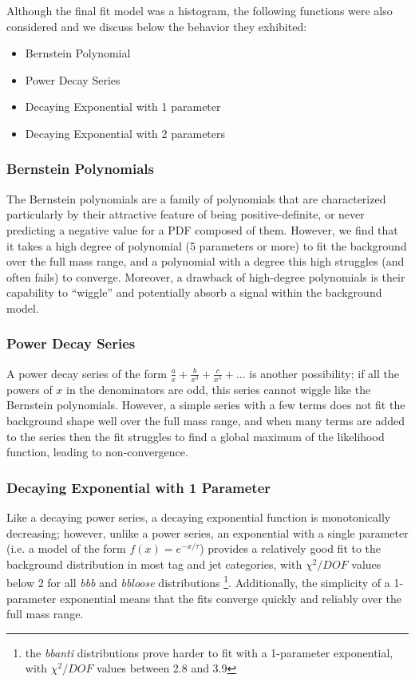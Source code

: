 Although the final fit model was a histogram, the following functions were
also considered and we discuss below the behavior they exhibited:
\begin{itemize}
    \item Bernstein Polynomial
    \item Power Decay Series
    \item Decaying Exponential with 1 parameter
    \item Decaying Exponential with 2 parameters
\end{itemize}

\subsubsection{Bernstein Polynomials}
The Bernstein polynomials are a family of polynomials that are characterized
particularly by their attractive feature of being positive-definite, or never
predicting a negative value for a PDF composed of them.  However, we find
that it takes a high degree of polynomial (5 parameters or more) to fit the
background over the full mass range, and a polynomial with a 
degree this high struggles (and often fails) to converge.  Moreover, a
drawback of high-degree polynomials is their capability to ``wiggle'' and
potentially absorb a signal within the background model.

\subsubsection{Power Decay Series}
A power decay series of the form $\frac{a}{x} + \frac{b}{x^3} + \frac{c}{x^5} + ...$
is another possibility; if all the powers of $x$ in the denominators are
odd, this series cannot wiggle like the Bernstein polynomials.  However,
a simple series with a few terms does not fit the background shape well 
over the full mass range, and when many terms are added to the series then
the fit struggles to find a global maximum of the likelihood function, leading
to non-convergence.

\subsubsection{Decaying Exponential with 1 Parameter}
Like a decaying power series, a decaying exponential function is monotonically
decreasing; however, unlike a power series, an exponential with a single
parameter (i.e. a model of the form $f(x)=e^{-x/\tau}$) provides 
a relatively good fit to the background distribution in most tag and jet
categories, with $\chi^2/DOF$ values below 2 for all \textit{bbb} and \textit{bbloose}
distributions \footnote{the \textit{bbanti} distributions prove harder to
fit with a 1-parameter exponential, with $\chi^2/DOF$ values between 2.8 and 3.9}.
Additionally, the simplicity of a 1-parameter exponential means that the
fits converge quickly and reliably over the full mass range.

